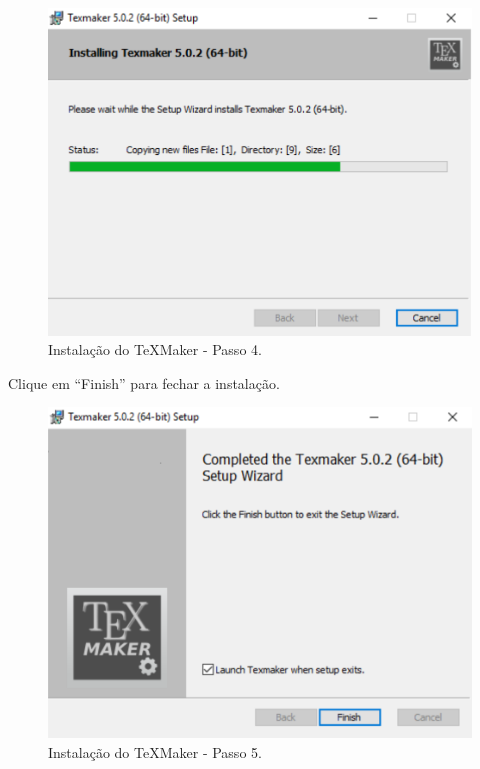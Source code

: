 \begin{figure}[h!]
  \begin{center}
    \includegraphics[scale=0.3]{imagens/texmaker/texmaker4.png}
  \end{center}
  \caption{Instalação do TeXMaker - Passo 4.}
  \label{tmk4}
\end{figure}

\newpage
Clique em “Finish” para fechar a instalação.

\begin{figure}[h!]
  \begin{center}
    \includegraphics[scale=0.3]{imagens/texmaker/texmaker5.png}
  \end{center}
  \caption{Instalação do TeXMaker - Passo 5.}
  \label{tmk5}
\end{figure}

